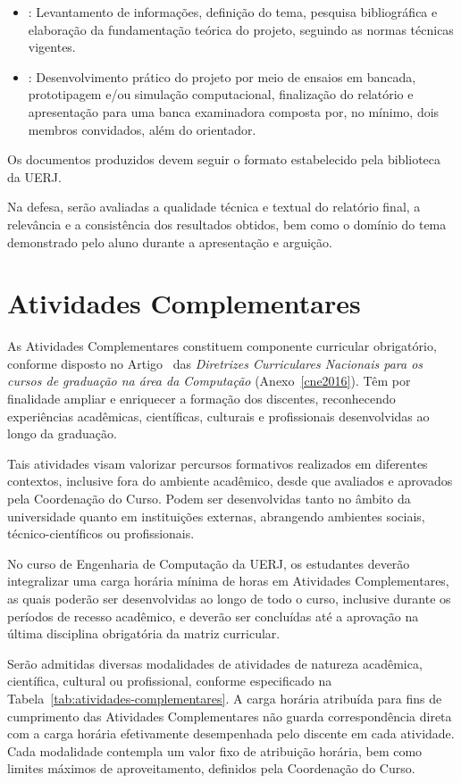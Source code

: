 \begin{itemize}
    \item \textbf{\ProjA}: Levantamento de informações, definição do tema, pesquisa bibliográfica e elaboração da fundamentação teórica do projeto, seguindo as normas técnicas vigentes.
    \item \textbf{\ProjB}: Desenvolvimento prático do projeto por meio de ensaios em bancada, prototipagem e/ou simulação computacional, finalização do relatório e apresentação para uma banca examinadora composta por, no mínimo, dois membros convidados, além do orientador.
\end{itemize}

Os documentos produzidos devem seguir o formato estabelecido pela biblioteca da UERJ.

Na defesa, serão avaliadas a qualidade técnica e textual do relatório final, a relevância e a consistência dos resultados obtidos, bem como o domínio do tema demonstrado pelo aluno durante a apresentação e arguição.


\section{Atividades Complementares}

As Atividades Complementares constituem componente curricular obrigatório, conforme disposto no Artigo~ das \textit{Diretrizes Curriculares Nacionais para os cursos de graduação na área da Computação} (Anexo~\ref{cne2016}). Têm por finalidade ampliar e enriquecer a formação dos discentes, reconhecendo experiências acadêmicas, científicas, culturais e profissionais desenvolvidas ao longo da graduação.

Tais atividades visam valorizar percursos formativos realizados em diferentes contextos, inclusive fora do ambiente acadêmico, desde que avaliados e aprovados pela Coordenação do Curso. Podem ser desenvolvidas tanto no âmbito da universidade quanto em instituições externas, abrangendo ambientes sociais, técnico-científicos ou profissionais.

No curso de Engenharia de Computação da UERJ, os estudantes deverão integralizar uma carga horária mínima de \hACC horas em Atividades Complementares, as quais poderão ser desenvolvidas ao longo de todo o curso, inclusive durante os períodos de recesso acadêmico, e deverão ser concluídas até a aprovação na última disciplina obrigatória da matriz curricular.

Serão admitidas diversas modalidades de atividades de natureza acadêmica, científica, cultural ou profissional, conforme especificado na Tabela~\ref{tab:atividades-complementares}. A carga horária atribuída para fins de cumprimento das Atividades Complementares não guarda correspondência direta com a carga horária efetivamente desempenhada pelo discente em cada atividade. Cada modalidade contempla um valor fixo de atribuição horária, bem como limites máximos de aproveitamento, definidos pela Coordenação do Curso.

